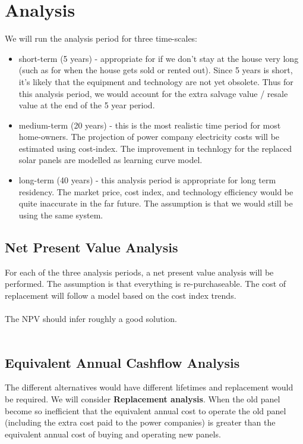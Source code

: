 \documentclass[10pt,letterpaper]{article}
\begin{document}
\section{Analysis}

We will run the analysis period for three time-scales: 

\begin{itemize}
	\item short-term (5 years) - appropriate for if we don't stay at the house very long (such as for when the house gets sold or rented out). Since 5 years is short, it's likely that the equipment and technology are not yet obsolete. Thus for this analysis period, we would account for the extra salvage value / resale value at the end of the 5 year period.\\

	\item medium-term (20 years) - this is the most realistic time period for most home-owners. The projection of power company electricity costs will be estimated using cost-index. The improvement in technlogy for the replaced solar panels are modelled as learning curve model.\\

	\item long-term (40 years) - this analysis period is appropriate for long term residency. The market price, cost index, and technology efficiency would be quite inaccurate in the far future. The assumption is that we would still be using the same system.
\end{itemize}

\subsection{Net Present Value Analysis}

For each of the three analysis periods, a net present value analysis will be performed. The assumption is that everything is re-purchaseable. The cost of replacement will follow a model based on the cost index trends.\\
\\
The NPV should infer roughly a good solution.\\
\\

\subsection{Equivalent Annual Cashflow Analysis}
The different alternatives would have different lifetimes and replacement would be required. We will consider \textbf{Replacement analysis}. When the old panel become so inefficient that the equivalent annual cost to operate the old panel (including the extra cost paid to the power companies) is greater than the equivalent annual cost of buying and operating new panels.\\
\end{document}
